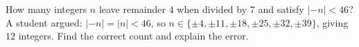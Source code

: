 How many integers $n$ leave remainder $4$ when divided by $7$ and satisfy $|-n|<46$? A student argued: $|-n|=|n|<46$, so $n\in\{\pm4,\pm11,\pm18,\pm25,\pm32,\pm39\}$, giving $12$ integers. Find the correct count and explain the error.
